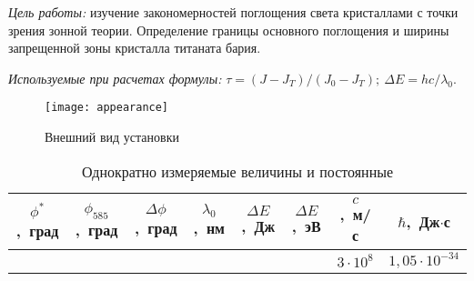 \documentclass[10pt, pscyr, nonums]{hedlabwork}
\begin{document}
    \makeheader

    \emph{Цель работы:} изучение закономерностей поглощения света кристаллами с
    точки зрения зонной теории. Определение границы основного поглощения и
    ширины запрещенной зоны кристалла титаната бария.
    
    \emph{Используемые при расчетах формулы:}
    \( \tau = (J - J_T)/(J_0 - J_T); \ \Delta E = hc/\lambda_0 \).

    \begin{figure}[h!]
        \center
        \texttt{[image: appearance]} \\
        \parbox{.5\textwidth}{\caption{Внешний вид установки}}
    \end{figure}
    
    \begin{table}[h!]
        \center \caption{Однократно измеряемые величины и постоянные}
        \begin{tabular}{|*{8}{C{.1}|}} \hline
            \( \phi^* \),~град & \( \phi_{585} \),~град &
                \( \Delta\phi \),~град & \( \lambda_0 \),~нм &
                \( \Delta E \),~Дж & \( \Delta E \),~эВ &
                \( c \),~м/с & \( \hbar \),~Дж\( \cdot \)с \\ \hline
            &&&&&& \( 3 \cdot 10^8 \) &
                \( 1,\!05 \cdot 10^{-34} \) \\ \hline
        \end{tabular}
    \end{table}
    
\end{document}
